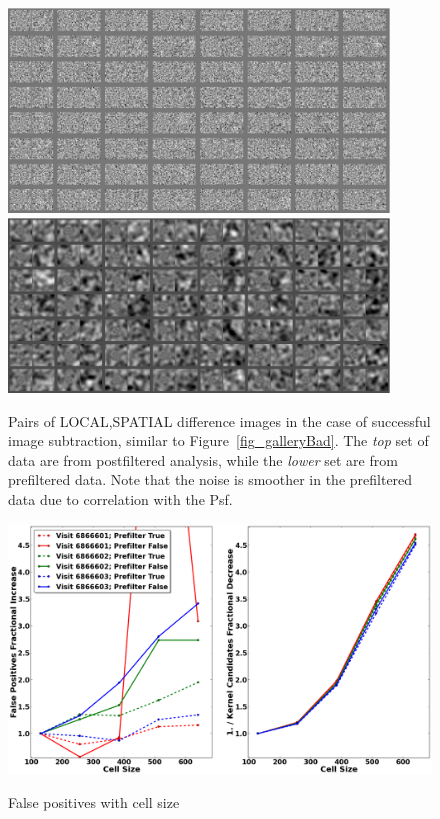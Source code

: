\documentclass[prd, nofootinbib, floatfix, 11pt,tightenlines,times]{article}
\begin{document}
\begin{figure}
\begin{center}
\includegraphics[width=0.9\textwidth]{figures/normal2.eps} \\
\includegraphics[width=0.9\textwidth]{figures/preconv2.eps} \\
\end{center}
\caption{Pairs of LOCAL,SPATIAL difference images in the case of
  successful image subtraction, similar to
  Figure~\ref{fig_galleryBad}.  The {\it top} set of data are from
  postfiltered analysis, while the {\it lower} set are from
  prefiltered data.  Note that the noise is smoother in the
  prefiltered data due to correlation with the Psf. }
\label{fig_galleryGood}
\end{figure}

\begin{figure}
\includegraphics[width=1.0\textwidth]{figures/cellsize.eps} \\
\caption{False positives with cell size
}
\label{cellsize}
\end{figure}
\end{document}

